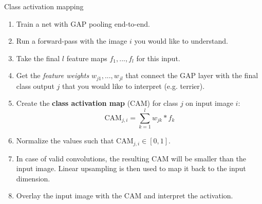 \begin{vbframe}{Class activation mapping}
    \begin{enumerate}
        \item Train a net with GAP pooling end-to-end.
        \item Run a forward-pass with the image $i$ you would like to understand.
        \item Take the final $l$ feature maps $f_1, ..., f_l$ for this input.
        \item Get the \textit{feature weights} $w_{j1}, ...,w_{jl}$ that connect the GAP layer with the final class output $j$ that you would like to interpret (e.g. terrier).
        \item Create the \textbf{class activation map} (CAM) for class $j$ on input image $i$:
        $$
            \text{CAM}_{j, i} = \sum_{k = 1}^{l}w_{jk} * f_k
        $$
        \item Normalize the values such that $\text{CAM}_{j, i} \in [0, 1]$.
        \item In case of valid convolutions, the resulting CAM will be smaller than the input image. Linear upsampling is then used to map it back to the input dimension.
        \item Overlay the input image with the CAM and interpret the activation.
    \end{enumerate}

\end{vbframe}







